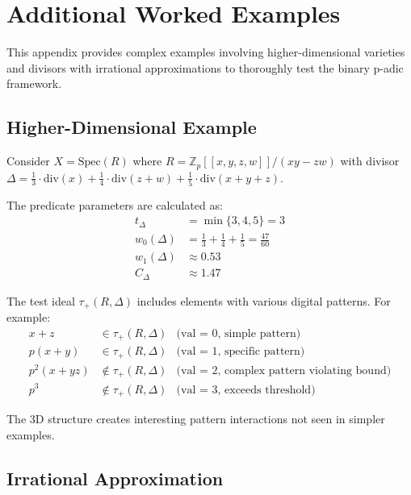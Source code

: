 \section{Additional Worked Examples}\label{app:additional-examples}

This appendix provides complex examples involving higher-dimensional varieties and divisors with irrational approximations to thoroughly test the binary p-adic framework.

\subsection{Higher-Dimensional Example}

\begin{example}
Consider $X = \text{Spec}(R)$ where $R = \mathbb{Z}_p[[x,y,z,w]]/(xy-zw)$ with divisor $\Delta = \frac{1}{3} \cdot \text{div}(x) + \frac{1}{4} \cdot \text{div}(z+w) + \frac{1}{5} \cdot \text{div}(x+y+z)$.

The predicate parameters are calculated as:
\begin{align*}
t_\Delta &= \min\{3, 4, 5\} = 3 \\
w_0(\Delta) &= \frac{1}{3} + \frac{1}{4} + \frac{1}{5} = \frac{47}{60} \\
w_1(\Delta) &\approx 0.53 \\
C_\Delta &\approx 1.47
\end{align*}

The test ideal $\tau_+(R,\Delta)$ includes elements with various digital patterns. For example:
\begin{align*}
x+z &\in \tau_+(R,\Delta) & \text{(val = 0, simple pattern)} \\
p(x+y) &\in \tau_+(R,\Delta) & \text{(val = 1, specific pattern)} \\
p^2(x+yz) &\notin \tau_+(R,\Delta) & \text{(val = 2, complex pattern violating bound)} \\
p^3 &\notin \tau_+(R,\Delta) & \text{(val = 3, exceeds threshold)}
\end{align*}

The 3D structure creates interesting pattern interactions not seen in simpler examples.
\end{example}

\subsection{Irrational Approximation}

